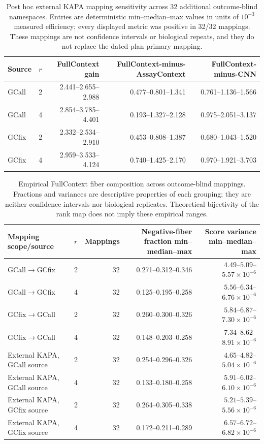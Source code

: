 \documentclass[10pt]{article}
\begin{document}
\begin{table}[H]
\centering
\scriptsize
\begin{tabular}{llrrr}
\toprule
Source & $r$ & FullContext gain & FullContext-minus-AssayContext & FullContext-minus-CNN \\
\midrule
GCall & 2 & 2.441--2.655--2.988 & 0.477--0.801--1.341 & 0.761--1.136--1.566 \\
GCall & 4 & 2.854--3.785--4.401 & 0.193--1.327--2.128 & 0.975--2.051--3.137 \\
GCfix & 2 & 2.332--2.534--2.910 & 0.453--0.808--1.387 & 0.680--1.043--1.520 \\
GCfix & 4 & 2.959--3.533--4.124 & 0.740--1.425--2.170 & 0.970--1.921--3.703 \\
\bottomrule
\end{tabular}
\caption{Post hoc external KAPA mapping sensitivity across 32 additional outcome-blind namespaces. Entries are deterministic min--median--max values in units of $10^{-3}$ measured efficiency; every displayed metric was positive in 32/32 mappings. These mappings are not confidence intervals or biological repeats, and they do not replace the dated-plan primary mapping.}
\label{tab:s-external-mapping-sensitivity}
\end{table}

\begin{table}[H]
\centering
\scriptsize
\begin{tabular}{llrrr}
\toprule
Mapping scope/source & $r$ & Mappings & Negative-fiber fraction min--median--max & Score variance min--median--max\\
\midrule
GCall$\rightarrow$GCfix & 2 & 32 & 0.271--0.312--0.346 & $4.49$--$5.09$--$5.57\times10^{-6}$\\
GCall$\rightarrow$GCfix & 4 & 32 & 0.125--0.195--0.258 & $5.56$--$6.34$--$6.76\times10^{-6}$\\
GCfix$\rightarrow$GCall & 2 & 32 & 0.260--0.300--0.326 & $5.84$--$6.87$--$7.30\times10^{-6}$\\
GCfix$\rightarrow$GCall & 4 & 32 & 0.148--0.203--0.258 & $7.34$--$8.62$--$8.91\times10^{-6}$\\
External KAPA, GCall source & 2 & 32 & 0.254--0.296--0.326 & $4.65$--$4.82$--$5.04\times10^{-6}$\\
External KAPA, GCall source & 4 & 32 & 0.133--0.180--0.258 & $5.91$--$6.02$--$6.10\times10^{-6}$\\
External KAPA, GCfix source & 2 & 32 & 0.264--0.305--0.338 & $5.21$--$5.39$--$5.56\times10^{-6}$\\
External KAPA, GCfix source & 4 & 32 & 0.172--0.211--0.289 & $6.57$--$6.72$--$6.82\times10^{-6}$\\
\bottomrule
\end{tabular}
\caption{Empirical FullContext fiber composition across outcome-blind mappings. Fractions and variances are descriptive properties of each grouping; they are neither confidence intervals nor biological replicates. Theoretical bijectivity of the rank map does not imply these empirical ranges.}
\label{tab:s-mapping-fiber-diagnostics}
\end{table}
\end{document}
